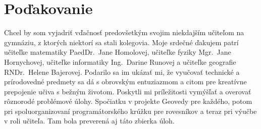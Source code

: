 \thispagestyle{empty}
\vspace*{\fill}
\section*{Poďakovanie}
Chcel by som vyjadriť vďačnosť predovšetkým svojim niekdajším učiteľom na gymnáziu, z ktorých niektorí sa stali kolegovia. Moje srdečné ďakujem patrí učiteľke matematiky PaedDr.~Jane Homolovej, učiteľke fyziky Mgr.~Jane Hornychovej, učiteľke informatiky Ing.~Darine Runovej a učiteľke geografie RNDr.~Helene Bajerovej. Podarilo sa im ukázať mi, že vyučovať technické a prírodovedné predmety sa dá s obrovským entuziazmom a citom pre kreatívne prepojenie učiva s bežným životom. Poskytli mi príležitosti vymýšľať a overovať rôznorodé problémové úlohy. Spočiatku v projekte Geovedy pre každého, potom pri spoluorganizovaní programátorského krúžku pre rovesníkov a teraz pri výučbe v roli učiteľa. Tam bola preverená aj táto zbierka úloh.
\vspace{3cm}